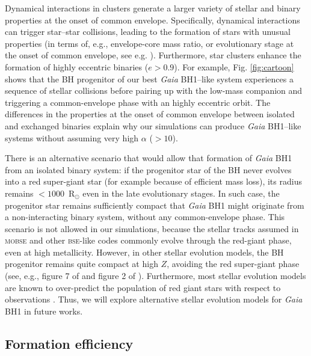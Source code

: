 \documentclass[fleqn,usenatbib]{mnras}
\newcommand{\bh}{\textit{Gaia} BH1}
\newcommand{\SR}[1]{\textcolor{red}{#1}}
\begin{document}
  
Dynamical interactions in  clusters generate a larger variety of stellar and binary properties at the onset of common envelope. 
Specifically, 
dynamical interactions 
can trigger star--star collisions,  
leading to the formation of stars with unusual properties  
(in terms of, e.g., envelope-core mass ratio, or evolutionary stage at the onset of common envelope, see e.g. %
\citealt{ivanova2002,schneider2019,schneider2020,costa2022,ballone2023}).
Furthermore,  
star clusters 
enhance the formation of highly eccentric binaries ($e>0.9$). 
For example, Fig. \ref{fig:cartoon} shows that the BH progenitor of our best \bh{}--like system 
experiences a sequence of stellar collisions before pairing up with the low-mass companion and triggering a common-envelope phase with an highly eccentric orbit. The differences in the properties at the onset of common envelope between isolated and exchanged binaries 
explain why our simulations can produce \bh--like systems without assuming very high $\alpha$ ($>10$).


There is an alternative scenario that would allow that formation of \bh{} from an isolated binary system: if the progenitor star of the BH never evolves into a red super-giant star (for example because of efficient mass loss), its radius remains $<1000$~R$_\odot$ even in the late evolutionary stages. In such case, the progenitor star remains sufficiently compact that \bh{} might originate from a non-interacting binary system, without any common-envelope phase. This scenario is not allowed in our simulations, because the stellar tracks assumed in \textsc{mobse} and other \textsc{bse}-like codes \citep{hurley02} commonly evolve through the red-giant phase, even at high metallicity. However, in other stellar evolution models, the BH progenitor remains quite compact at high $Z$, avoiding the red super-giant phase (see, e.g., figure 7 of \citealt{iorio2023} and figure 2 of \citealt{agrawal2022}). Furthermore, most stellar evolution models are known to over-predict the population of red giant stars with respect to observations \citep[e.g.,][]{Gilkis2021,Romagnolo2022}. Thus, we will explore alternative stellar evolution models for \bh{} in future works.






\subsection{Formation efficiency} \label{sec:eff}
\end{document}
